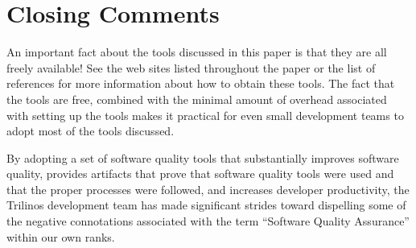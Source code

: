 \documentclass[12pt,relax]{article}
\begin{document}
\section{Closing Comments}

An important fact about the tools discussed in this paper is that they are all 
freely available!  See the web sites listed throughout the paper or the list 
of references for more information about how to obtain these tools.  The fact 
that the tools are free, combined with the minimal amount of overhead 
associated with setting up the tools makes it practical for even small 
development teams to adopt most of the tools discussed.  

By adopting a set of software quality tools that substantially improves
software quality, provides artifacts that prove that software quality tools 
were used and that the proper processes were followed, and increases developer
productivity, the Trilinos development team has made significant strides 
toward dispelling some of the negative connotations associated with the term
``Software Quality Assurance'' within our own ranks.

\clearpage

%

\end{document}

